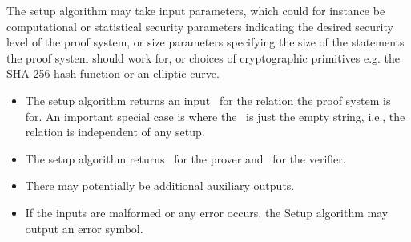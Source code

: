 The setup algorithm may take input parameters, which could for instance be computational or statistical security parameters indicating the desired security level of the proof system, or size parameters specifying the size of the statements the proof system should work for, or choices of cryptographic primitives e.g. the SHA-256 hash function or an elliptic curve.

\begin{itemize}
\item The setup algorithm returns an input \setR\ for the relation the proof system is for. An important special case is where the \setR\ is just the empty string, i.e., the relation is independent of any setup.
\item The setup algorithm returns \setP\ for the prover and \setV\ for the verifier.
\item There may potentially be additional auxiliary outputs.
\item If the inputs are malformed or any error occurs, the Setup algorithm may output an error symbol.
\end{itemize}



